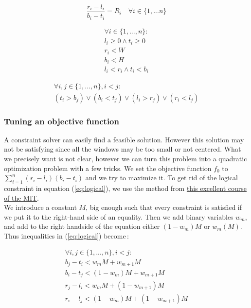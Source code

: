 \documentclass{acmtog}
\begin{document}
\begin{equation}
\dfrac{r_i - l_i}{b_i - t_i} = R_i \quad \forall  i \in  \{1, ... n\}
\end{equation}

\begin{equation}
\begin{split}
\forall  i \in  \{1, ... ,n\}  :\\
l_i \geq 0 \wedge t_i \geq 0 \\
 r_i < W \\
 b_i  < H  \\
l_i < r_i \wedge t_i < b_i
\end{split}
\end{equation}


\begin{equation}
\begin{split}
\forall i, j \in \{1,..., n\}, i < j : \\
(t_i > b_j) \lor (b_i < t_j) \lor (l_i > r_j) \lor (r_i < l_j)
\end{split}
\label{eq:logical}
\end{equation}

\subsubsection{Tuning an objective function}
A constraint solver can easily find a feasible solution. However this solution may not be satisfying since all the windows may be too small or not centered. What we precisely want is not clear, however we can turn this problem into a quadratic optimization problem with a few tricks. We set the objective function $f_0$  to $\sum_{i=1}^{n}{(r_i-l_i)(b_i-t_i)}$ and we try to maximize it.  To get rid of the logical constraint in equation (\ref{eq:logical}), we use the method from \href{https://ocw.mit.edu/courses/sloan-school-of-management/15-053-optimization-methods-in-management-science-spring-2013/lecture-notes/MIT15_053S13_lec11.pdf}{this excellent course of the MIT}.\\ 
We introduce a constant $M$, big enough such that every constraint is satisfied if we put it to the right-hand side of an equality. Then we add binary variables $w_m$, and add to the right handside of the equation either $(1-w_m) M$ or  $w_m(M)$. Thus inequalities in (\ref{eq:logical}) become\,: 

\begin{equation}
\begin{split}
\forall i, j \in \{1,..., n\}, i < j : \\
b_j - t_i < w_mM + w_{m+1}M \\
 b_i - t_j < (1-w_m)M + w_{m+1}M \\
r_j - l_i < w_mM + (1-w_{m+1})M \\
r_i - l_j < (1-w_m)M + (1-w_{m+1})M\\
\end{split}
\end{equation}
\end{document}
